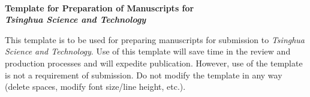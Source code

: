 \documentclass[10.5pt,compsoc]{TsT}
\theoremstyle{mystyle}
\begin{document}
\thispagestyle{empty}

\begin{strip}
\noindent
\\ \textbf{Template for Preparation of Manuscripts for \\ \emph{Tsinghua Science and Technology}}
\vskip 6mm

\noindent
This template is to be used for preparing manuscripts for submission to \emph{Tsinghua Science and Technology}. Use of this template will save time in the review and production processes and will expedite publication. However, use of the template is not a requirement of submission. Do not modify the template in any way (delete spaces, modify font size/line height, etc.).
\vspace{180mm}
\end{strip}
\clearpage


\makeatletter
\newcommand\mysmall{\@setfontsize\mysmall{7}{9.5}}

\newenvironment{tablehere}
  {\def\@captype{table}}
  {}
\newenvironment{figurehere}
  {\def\@captype{figure}}
  {}

\thispagestyle{plain}%
\thispagestyle{empty}%

\let\temp\footnote
\renewcommand \footnote[1]{\temp{\zihao{-5}#1}}
{}
\vspace*{-40pt}

{}
\end{document}
